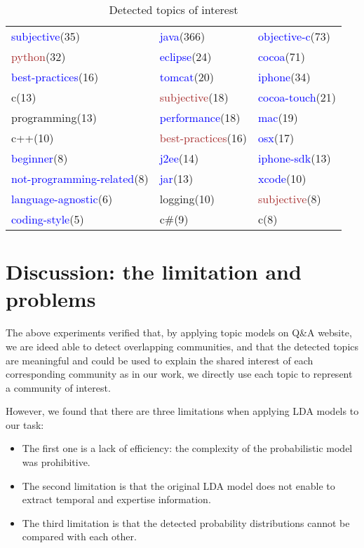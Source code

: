 \begin{sidewaystable}
\begin{tabular}{l|l|l}
\hline
\textcolor{blue}{subjective}(35)&\textcolor{blue}{java}(366)&\textcolor{blue}{objective-c}(73)\\
\textcolor{brown}{python}(32)&\textcolor{blue}{eclipse}(24)&\textcolor{blue}{cocoa}(71)\\
\textcolor{blue}{best-practices}(16)&\textcolor{blue}{tomcat}(20)&\textcolor{blue}{iphone}(34)\\
c(13)&\textcolor{brown}{subjective}(18)&\textcolor{blue}{cocoa-touch}(21)\\
programming(13)&\textcolor{blue}{performance}(18)&\textcolor{blue}{mac}(19)\\
c++(10)&\textcolor{brown}{best-practices}(16)&\textcolor{blue}{osx}(17)\\
\textcolor{blue}{beginner}(8)&\textcolor{blue}{j2ee}(14)&\textcolor{blue}{iphone-sdk}(13)\\
\textcolor{blue}{not-programming-related}(8)&\textcolor{blue}{jar}(13)&\textcolor{blue}{xcode}(10)\\
\textcolor{blue}{language-agnostic}(6)&logging(10)&\textcolor{brown}{subjective}(8)\\
\textcolor{blue}{coding-style}(5)&c\#(9)&c(8)\\
\hline
\end{tabular}
\caption{Detected topics of interest}
\label{tab:ldaresult2}
\end{sidewaystable}

\section{Discussion: the limitation and problems}
The above experiments verified that, by applying topic models on Q\&A website, we are ideed able to detect overlapping communities, and that the detected topics are meaningful and could be used to explain the shared interest of each corresponding community as in our work, we directly use each topic to represent a community of interest.

However, we found that there are three limitations when applying LDA models to our task:

\begin{itemize}
  \item The first one is a lack of efficiency: the complexity of the probabilistic model was prohibitive.
  \item The second limitation is that the  original LDA model does not enable to extract temporal and expertise information. 
  \item The third limitation is that the detected probability distributions cannot be compared with each other.
\end{itemize}

